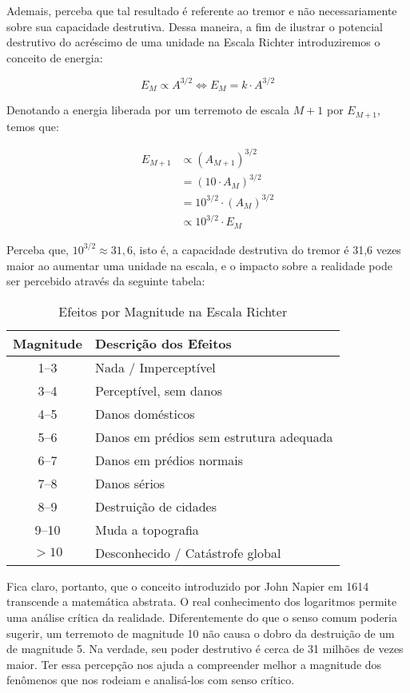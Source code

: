 Ademais, perceba que tal resultado é referente ao tremor e não necessariamente sobre sua capacidade destrutiva. Dessa maneira, a fim de ilustrar o potencial destrutivo do acréscimo de uma unidade na Escala Richter introduziremos o conceito de energia:

\begin{equation*}
    E_M \propto A^{3/2} \iff E_M = k \cdot A^{3/2}
\end{equation*}

Denotando a energia liberada por um terremoto de escala $M+1$ por $E_{M+1}$, temos que:

\begin{align*}
    E_{M+1} &\propto (A_{M+1})^{3/2} \\
            &= (10 \cdot A_M)^{3/2} \\
            &= 10^{3/2} \cdot (A_M)^{3/2} \\
            &\propto 10^{3/2} \cdot E_M
\end{align*}

Perceba que, $10^{3/2} \approx 31,6$, isto é, a capacidade destrutiva do tremor é 31,6 vezes maior ao aumentar uma unidade na escala, e o impacto sobre a realidade pode ser percebido através da seguinte tabela:

\begin{table}[H]
\centering
\label{tab:richter_simples}
\begin{tabular}{|c|l|}
    \hline
\textbf{Magnitude} & \textbf{Descrição dos Efeitos} \\
\hline
1--3 & Nada / Imperceptível \\
3--4 & Perceptível, sem danos \\
4--5 & Danos domésticos \\
5--6 & Danos em prédios sem estrutura adequada \\
6--7 & Danos em prédios normais \\
7--8 & Danos sérios \\
8--9 & Destruição de cidades \\
9--10 & Muda a topografia \\
$>10$ & Desconhecido / Catástrofe global \\
\hline
\end{tabular}
\caption{Efeitos por Magnitude na Escala Richter}
\end{table}



Fica claro, portanto, que o conceito introduzido por John Napier em 1614 transcende a matemática abstrata. O real conhecimento dos logaritmos permite uma análise crítica da realidade. Diferentemente do que o senso comum poderia sugerir, um terremoto de magnitude 10 não causa o dobro da destruição de um de magnitude 5. Na verdade, seu poder destrutivo é cerca de 31 milhões de vezes maior. Ter essa percepção nos ajuda a compreender melhor a magnitude dos fenômenos que nos rodeiam e analisá-los com senso crítico.
